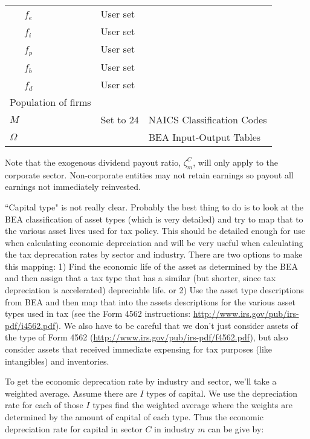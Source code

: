 \documentclass[article,11pt,letterpaper,fleqn]{article}
\theoremstyle{definition}
\numberwithin{equation}{section}
\begin{document}
\begin{landscape}
\begin{table}[htbp]
\begin{tabular}{lll}
    \ \ \ $f_{e}$ & User set &  \\
    \ \ \ $f_{i}$ & User set &  \\
    \ \ \ $f_{p}$ & User set &  \\
    \ \ \ $f_{b}$ & User set &  \\
    \ \ \ $f_{d}$ & User set &  \\
    Population of firms &       &  \\
    $M$   & Set to 24 & NAICS Classification Codes \\
    $\Omega$ &       & BEA Input-Output Tables \\
     \hline
    \hline
    \end{tabular}%
  \label{tab:calib_supply}%
\end{table}%
\end{landscape}

Note that the exogenous dividend payout ratio, $\zeta^{C}_{m}$, will only apply to the corporate sector.  Non-corporate entities may not retain earnings so payout all earnings not immediately reinvested.

``Capital type" is not really clear.  Probably the best thing to do is to look at the BEA classification of asset types (which is very detailed) and try to map that to the various asset lives used for tax policy.  This should be detailed enough for use when calculating economic depreciation and will be very useful when calculating the tax deprecation rates by sector and industry.  There are two options to make this mapping: 1) Find the economic life of the asset as determined by the BEA and then assign that a tax type that has a similar (but shorter, since tax depreciation is accelerated) depreciable life. or 2) Use the asset type descriptions from BEA and then map that into the assets descriptions for the various asset types used in tax (see the Form 4562 instructions: \url{http://www.irs.gov/pub/irs-pdf/i4562.pdf}).  We also have to be careful that we don't just consider assets of the type of Form 4562 (\url{http://www.irs.gov/pub/irs-pdf/f4562.pdf}), but also consider assets that received immediate expensing for tax purposes (like intangibles) and inventories.

To get the economic deprecation rate by industry and sector, we'll take a weighted average.  Assume there are $I$ types of capital.  We use the depreciation rate for each of those $I$ types find the weighted average where the weights are determined by the amount of capital of each type.  Thus the economic depreciation rate for capital in sector $C$ in industry $m$ can be give by:
\end{document}
